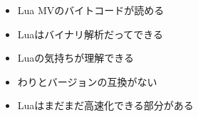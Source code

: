 \begin{frame}
	\frametitlesec
	\begin{itemize}
		\item Lua MVのバイトコードが読める
		\item Luaはバイナリ解析だってできる
		\item Luaの気持ちが理解できる
		\item わりとバージョンの互換がない
		\item Luaはまだまだ高速化できる部分がある
	\end{itemize}
\end{frame}
